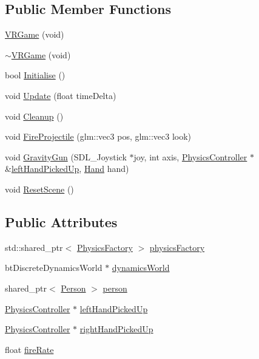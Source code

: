 \subsection*{Public Member Functions}
\begin{DoxyCompactItemize}
\item 
\hyperlink{class_b_g_e_1_1_v_r_game_ae0cfdcba65a15f68e3c05611b4b1080c}{V\-R\-Game} (void)
\item 
\hyperlink{class_b_g_e_1_1_v_r_game_a480576207afa4c6c245cd92d41832279}{$\sim$\-V\-R\-Game} (void)
\item 
bool \hyperlink{class_b_g_e_1_1_v_r_game_a577e86f3ba2b3b259d1fe1ba07036926}{Initialise} ()
\item 
void \hyperlink{class_b_g_e_1_1_v_r_game_a1883e546b4e2741354ba5abd9a14da08}{Update} (float time\-Delta)
\item 
void \hyperlink{class_b_g_e_1_1_v_r_game_aba09f1bf0d80502909ad2a918fd10425}{Cleanup} ()
\item 
void \hyperlink{class_b_g_e_1_1_v_r_game_a381366381bd612e62acf70ed651fd61f}{Fire\-Projectile} (glm\-::vec3 pos, glm\-::vec3 look)
\item 
void \hyperlink{class_b_g_e_1_1_v_r_game_a3b80e3eab3ef68a04e84babc2ff4c217}{Gravity\-Gun} (S\-D\-L\-\_\-\-Joystick $\ast$joy, int axis, \hyperlink{class_b_g_e_1_1_physics_controller}{Physics\-Controller} $\ast$\&\hyperlink{class_b_g_e_1_1_v_r_game_a7f3544727467ab0e3fabcca9c7a5c073}{left\-Hand\-Picked\-Up}, \hyperlink{struct_b_g_e_1_1_hand}{Hand} hand)
\item 
void \hyperlink{class_b_g_e_1_1_v_r_game_a16393286727104ce32d6f253bdd7fa9a}{Reset\-Scene} ()
\end{DoxyCompactItemize}
\subsection*{Public Attributes}
\begin{DoxyCompactItemize}
\item 
std\-::shared\-\_\-ptr$<$ \hyperlink{class_b_g_e_1_1_physics_factory}{Physics\-Factory} $>$ \hyperlink{class_b_g_e_1_1_v_r_game_a488bfb46d4e11cf79e2822d36bc47fa0}{physics\-Factory}
\item 
bt\-Discrete\-Dynamics\-World $\ast$ \hyperlink{class_b_g_e_1_1_v_r_game_a05ae7062cc8fbb33f62dd75519445153}{dynamics\-World}
\item 
shared\-\_\-ptr$<$ \hyperlink{class_b_g_e_1_1_person}{Person} $>$ \hyperlink{class_b_g_e_1_1_v_r_game_a0a440b184bb5ae52a1d5cdab14822d9b}{person}
\item 
\hyperlink{class_b_g_e_1_1_physics_controller}{Physics\-Controller} $\ast$ \hyperlink{class_b_g_e_1_1_v_r_game_a7f3544727467ab0e3fabcca9c7a5c073}{left\-Hand\-Picked\-Up}
\item 
\hyperlink{class_b_g_e_1_1_physics_controller}{Physics\-Controller} $\ast$ \hyperlink{class_b_g_e_1_1_v_r_game_a8e9d2697bebe33f0849a5b13aa84f8b8}{right\-Hand\-Picked\-Up}
\item 
float \hyperlink{class_b_g_e_1_1_v_r_game_a596c5ed67ea924b37874197b96a3e445}{fire\-Rate}
\end{DoxyCompactItemize}
